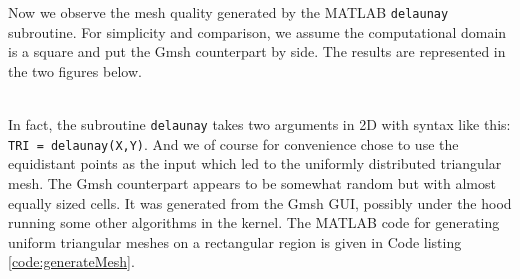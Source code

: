 	Now we observe the mesh quality generated by the MATLAB \texttt{delaunay}
	subroutine. For simplicity and comparison, we assume the computational 
	domain is a square and put the Gmsh counterpart by side. The results are 
	represented in the two figures below.\vspace{-10pt}	
	\begin{figure}[!htbp]
	\end{figure}\\
	In fact, the subroutine \texttt{delaunay} takes two arguments in 2D with 
	syntax like this: \texttt{TRI = delaunay(X,Y)}. And we of course for 
	convenience chose to use the equidistant points as the input which led to
	the uniformly distributed triangular mesh. The Gmsh counterpart appears to 
	be somewhat random but with almost equally sized cells. It was generated 
	from the Gmsh GUI, possibly under the hood running some other algorithms in 
	the kernel. The MATLAB code for generating uniform triangular meshes on a
	rectangular region is given in Code listing \ref{code:generateMesh}.
	\vspace{-8pt}
